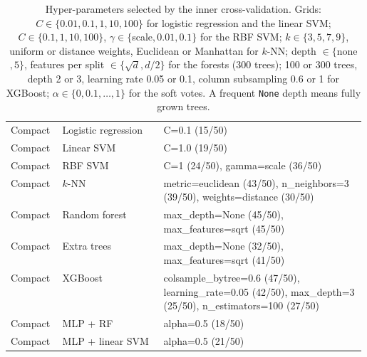 \begin{table}[H]
\begin{adjustbox}{max width=\linewidth}
\begin{tabular}{llp{0.58\linewidth}}
Compact & Logistic regression & C=0.1 (15/50) \\
Compact & Linear SVM & C=1.0 (19/50) \\
Compact & RBF SVM & C=1 (24/50), gamma=scale (36/50) \\
Compact & $k$-NN & metric=euclidean (43/50), n\_neighbors=3 (39/50), weights=distance (30/50) \\
Compact & Random forest & max\_depth=None (45/50), max\_features=sqrt (45/50) \\
Compact & Extra trees & max\_depth=None (32/50), max\_features=sqrt (41/50) \\
Compact & XGBoost & colsample\_bytree=0.6 (47/50), learning\_rate=0.05 (42/50), max\_depth=3 (25/50), n\_estimators=100 (27/50) \\
Compact & MLP + RF & alpha=0.5 (18/50) \\
Compact & MLP + linear SVM & alpha=0.5 (21/50) \\
\bottomrule
\end{tabular}
\end{adjustbox}
\caption{Hyper-parameters selected by the inner cross-validation. Grids: $C\in\{0.01,0.1,1,10,100\}$ for logistic regression and the linear SVM; $C\in\{0.1,1,10,100\}$, $\gamma\in\{$scale$, 0.01, 0.1\}$ for the RBF SVM; $k\in\{3,5,7,9\}$, uniform or distance weights, Euclidean or Manhattan for $k$-NN; depth $\in\{$none$, 5\}$, features per split $\in\{\sqrt{d}, d/2\}$ for the forests (300 trees); 100 or 300 trees, depth 2 or 3, learning rate 0.05 or 0.1, column subsampling 0.6 or 1 for XGBoost; $\alpha\in\{0,0.1,\dots,1\}$ for the soft votes. A frequent \texttt{None} depth means fully grown trees.}
\label{tab:supp-hyper}
\end{table}

